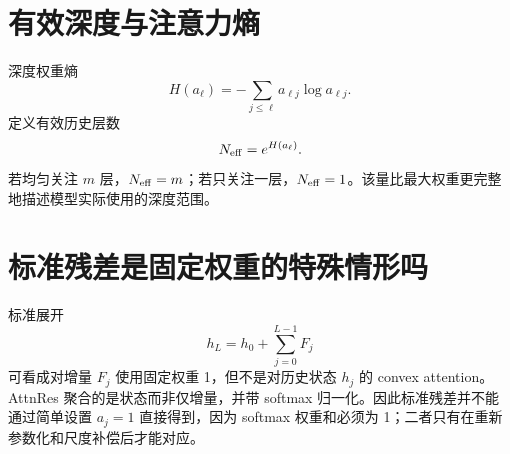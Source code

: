 \documentclass[UTF8,12pt,a4paper,fontset=none]{ctexart}
\numberwithin{equation}{section}
\begin{document}
\section{有效深度与注意力熵}
深度权重熵
\begin{equation}
 H(a_\ell)=-\sum_{j\le\ell}a_{\ell j}\log a_{\ell j}.
\end{equation}
定义有效历史层数
\begin{equation}
 N_{\rm eff}=e^{H(a_\ell)}.
\end{equation}
若均匀关注 $m$ 层，$N_{\rm eff}=m$；若只关注一层，$N_{\rm eff}=1$。该量比最大权重更完整地描述模型实际使用的深度范围。

\section{标准残差是固定权重的特殊情形吗}
标准展开
\begin{equation}
 h_L=h_0+\sum_{j=0}^{L-1}F_j
\end{equation}
可看成对增量 $F_j$ 使用固定权重 1，但不是对历史状态 $h_j$ 的 convex attention。AttnRes 聚合的是状态而非仅增量，并带 softmax 归一化。因此标准残差并不能通过简单设置 $a_j=1$ 直接得到，因为 softmax 权重和必须为 1；二者只有在重新参数化和尺度补偿后才能对应。
\end{document}
